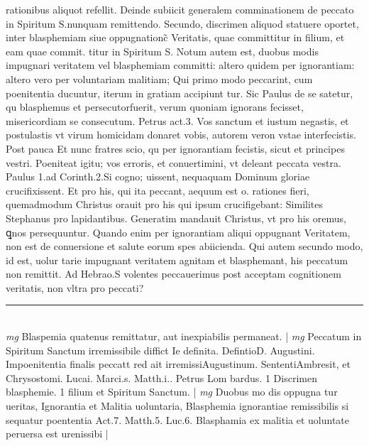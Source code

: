 \documentclass{article}
\begin{document}
\begin{pages}
rationibus aliquot refellit. Deinde subiicit generalem comminationem de peccato in Spiritum S.nunquam remittendo. Secundo, discrimen aliquod statuere oportet, inter blasphemiam siue oppugnationc̃ Veritatis, quae committitur in filium, et eam quae commit. titur in Spiritum S. Notum autem est, duobus modis impugnari veritatem vel blasphemiam committi: altero quidem per ignorantiam: altero vero per voluntariam malitiam; Qui primo modo peccarint, cum poenitentia ducuntur, iterum in gratiam accipiunt tur. Sic Paulus de se satetur, qu blasphemus et persecutorfuerit, verum quoniam ignorans fecisset, misericordiam se consecutum. Petrus act.3. Vos sanctum et iustum negastis, et postulastis vt virum homicidam donaret vobis, autorem veron vstae interfecistis. Post pauca Et nunc fratres scio, qu per ignorantiam fecistis, sicut et principes vestri. Poeniteat igitu; vos erroris, et conuertimini, vt deleant peccata vestra. Paulus 1.ad Corinth.2.Si cogno; uissent, nequaquam Dominum gloriae crucifixissent. Et pro his, qui ita peccant, aequum est o. rationes fieri, quemadmodum Christus orauit pro his qui ipsum crucifigebant: Similites Stephanus pro lapidantibus. Generatim mandauit Christus, vt pro his oremus, ꝗnos persequuntur. Quando enim per ignorantiam aliqui oppugnant Veritatem, non est de conuersione et salute eorum spes abiicienda. Qui autem secundo modo, id est, uolur tarie impugnant veritatem agnitam et blasphemant, his peccatum non remittit. Ad Hebrao.S volentes peccauerimus post acceptam cognitionem veritatis, non vltra pro peccati?  \pend
\vspace{0.5cm}\noindent
\vspace{0.2cm}\rule{1cm}{0.2pt}\\ 
\hspace{0.2cm}\textit{mg}
\footnotesize Blaspemia quatenus remittatur, aut inexpiabilis permaneat. 
\normalsize| 
\hspace{0.2cm}\textit{mg}
\footnotesize Peccatum in Spiritum Sanctum irremissibile diffict Ie definita. DefintioD. Augustini. Impoenitentia finalis peccatt red ait irremissiAugustinum. SententiAmbresit, et Chrysostomi. Lucai. Marci.s. Matth.i.. Petrus Lom bardus. 1 Discrimen blasphemie. 1 filium et Spiritum Sanctum. 
\normalsize| 
\hspace{0.2cm}\textit{mg}
\footnotesize Duobus mo dis oppugna tur ueritas, Ignorantia et Malitia uoluntaria, Blasphemia ignorantiae remissibilis si sequatur poententia Act.7. Matth.5. Luc.6. Blasphamia ex malitia et uoluntate peruersa est urenissibi
\normalsize| 

\end{pages}
\end{document}
